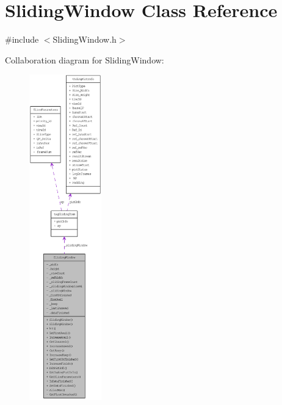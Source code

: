 \hypertarget{class_sliding_window}{
\section{SlidingWindow Class Reference}
\label{class_sliding_window}
}


{\ttfamily \#include $<$SlidingWindow.h$>$}



Collaboration diagram for SlidingWindow:\nopagebreak
\begin{figure}[H]
\begin{center}
\leavevmode
\includegraphics[height=400pt]{class_sliding_window__coll__graph}
\end{center}
\end{figure}
